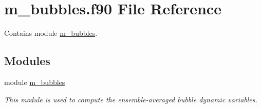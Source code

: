 \hypertarget{m__bubbles_8f90}{}\section{m\+\_\+bubbles.\+f90 File Reference}
\label{m__bubbles_8f90}


Contains module \hyperlink{namespacem__bubbles}{m\+\_\+bubbles}.  


\subsection*{Modules}
\begin{DoxyCompactItemize}
\item 
module \hyperlink{namespacem__bubbles}{m\+\_\+bubbles}
\begin{DoxyCompactList}\small\item\em This module is used to compute the ensemble-\/averaged bubble dynamic variables. \end{DoxyCompactList}\end{DoxyCompactItemize}
